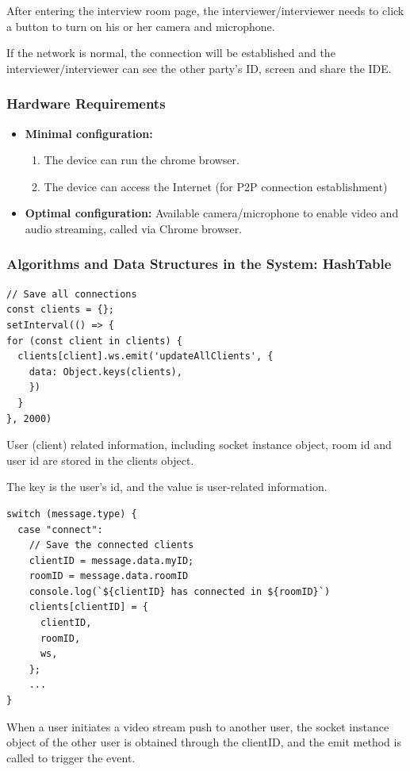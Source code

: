\documentclass{article}
\begin{document}
After entering the interview room page, the interviewer/interviewer needs to click a button to turn on his or her camera and microphone.

If the network is normal, the connection will be established and the interviewer/interviewer can see the other party's ID, screen and share the IDE.

\subsubsection*{Hardware Requirements}
\begin{itemize}
  \item \textbf{Minimal configuration:} 
  \begin{enumerate}
    \item The device can run the chrome browser.
    \item The device can access the Internet (for P2P connection establishment)
  \end{enumerate}
  \item \textbf{Optimal configuration:} Available camera/microphone to enable video and audio streaming, called via Chrome browser.
\end{itemize}

\subsubsection*{Algorithms and Data Structures in the System: HashTable}
\begin{lstlisting}
// Save all connections
const clients = {};
setInterval(() => {
for (const client in clients) {
  clients[client].ws.emit('updateAllClients', {
    data: Object.keys(clients),
    })
  }
}, 2000)
\end{lstlisting}
User (client) related information, including socket instance object, room id and user id are stored in the clients object.

The key is the user's id, and the value is user-related information.
\begin{lstlisting}
switch (message.type) {
  case "connect":
    // Save the connected clients
    clientID = message.data.myID;
    roomID = message.data.roomID
    console.log(`${clientID} has connected in ${roomID}`)
    clients[clientID] = {
      clientID,
      roomID,
      ws,
    };
    ...
}
\end{lstlisting}
When a user initiates a video stream push to another user, the socket instance object of the other user is obtained through the clientID, and the emit method is called to trigger the event.
\end{document}

